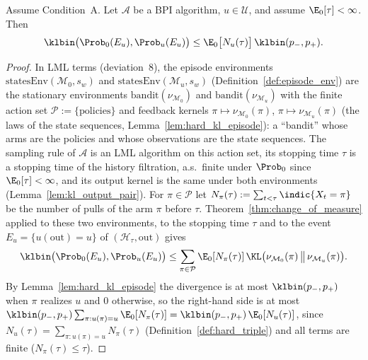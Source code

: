 \begin{lemma}\label{lem:hard_change_of_measure}
\leanok
Assume Condition~A. Let $\mathcal A$ be a BPI algorithm, $u \in \mathcal U$, and assume
$\E_0[\tau] < \infty$. Then
\[
  \klbin\big(\Prob_0(E_u), \Prob_u(E_u)\big) \le \E_0\big[N_u(\tau)\big]\,\klbin(p_-, p_+) .
\]
\end{lemma}

\begin{proof}
\leanok
{}
In LML terms (deviation~8), the episode environments $\mathrm{statesEnv}(\mathcal M_0, s_w)$ and
$\mathrm{statesEnv}(\mathcal M_u, s_w)$ (Definition~\ref{def:episode_env}) are the stationary
environments $\mathrm{bandit}(\nu_{\mathcal M_0})$ and $\mathrm{bandit}(\nu_{\mathcal M_u})$
with the finite action set $\mathcal P := \{\text{policies}\}$ and feedback kernels
$\pi \mapsto \nu_{\mathcal M_0}(\pi)$, $\pi \mapsto \nu_{\mathcal M_u}(\pi)$ (the laws of the state
sequences, Lemma~\ref{lem:hard_kl_episode}): a ``bandit'' whose arms are the policies and whose
observations are the state sequences. The sampling rule of $\mathcal A$ is an LML algorithm on
this action set, its stopping time $\tau$ is a stopping time of the history filtration, a.s.\
finite under $\Prob_0$ since $\E_0[\tau] < \infty$, and its output kernel is the same under both
environments (Lemma~\ref{lem:kl_output_pair}). For $\pi \in \mathcal P$ let
$N_\pi(\tau) := \sum_{t < \tau}\indic\{X_t = \pi\}$ be the number of pulls of the arm $\pi$
before $\tau$. Theorem~\ref{thm:change_of_measure} applied to these two environments, to the
stopping time $\tau$ and to the event $E_u = \{u(\mathrm{out}) = u\}$ of $(\mathcal H_\tau, \mathrm{out})$
gives
\[
  \klbin\big(\Prob_0(E_u), \Prob_u(E_u)\big) \le \sum_{\pi \in \mathcal P}\E_0[N_\pi(\tau)]\,\KL\big(\nu_{\mathcal M_0}(\pi)\,\big\|\,\nu_{\mathcal M_u}(\pi)\big) .
\]
By Lemma~\ref{lem:hard_kl_episode} the divergence is at most $\klbin(p_-,p_+)$ when $\pi$
realizes $u$ and $0$ otherwise, so the right-hand side is at most
$\klbin(p_-,p_+)\sum_{\pi : u(\pi) = u}\E_0[N_\pi(\tau)] = \klbin(p_-,p_+)\,\E_0[N_u(\tau)]$,
since $N_u(\tau) = \sum_{\pi : u(\pi) = u} N_\pi(\tau)$ (Definition~\ref{def:hard_triple}) and
all terms are finite ($N_\pi(\tau) \le \tau$).
\end{proof}

